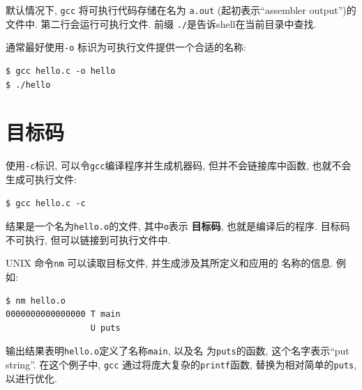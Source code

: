 \documentclass[12pt]{book}
\begin{document}
{%
默认情况下, {\tt gcc} 将可执行代码存储在名为 {\tt a.out}
(起初表示``assembler output'')的文件中.
第二行会运行可执行文件. 
前缀 \verb"./"是告诉shell在当前目录中查找.

通常最好使用{\tt -o} 标识为可执行文件提供一个合适的名称:

\begin{verbatim}
$ gcc hello.c -o hello
$ ./hello
\end{verbatim}

\section{目标码}

使用{\tt -c}标识, 可以令{\tt gcc}编译程序并生成机器码, 但并不会链接库中函数, 也就不会生成可执行文件:

\begin{verbatim}
$ gcc hello.c -c
\end{verbatim}

结果是一个名为{\tt hello.o}的文件, 其中{\tt o}表示
{\bf 目标码}, 也就是编译后的程序. 
目标码不可执行, 但可以链接到可执行文件中.

UNIX 命令{\tt nm} 可以读取目标文件, 并生成涉及其所定义和应用的
名称的信息. 例如:

\begin{verbatim}
$ nm hello.o
0000000000000000 T main
                 U puts
\end{verbatim}
输出结果表明{\tt hello.o}定义了名称{\tt main}, 以及名
为{\tt puts}的函数, 这个名字表示``put string''.
在这个例子中, {\tt gcc} 通过将庞大复杂的{\tt printf}函数,
替换为相对简单的{\tt puts}, 以进行优化.


}
\end{document}
